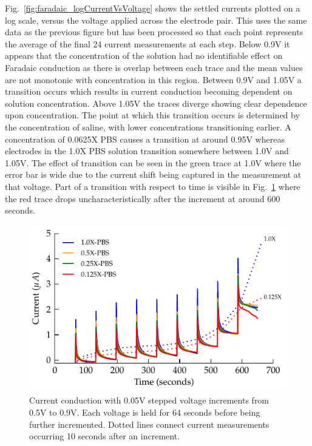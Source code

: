 \documentclass[journal, a4paper]{IEEEtran}
\begin{document}
Fig.~\ref{fig:faradaic_logCurrentVsVoltage} shows the settled currents plotted on a log scale, versus the voltage applied across the electrode pair. This uses the same data as the previous figure but has been processed so that each point represents the average of the final 24 current measurements at each step. Below 0.9\thinspace V it appears that the concentration of the solution had no identifiable effect on Faradaic conduction as there is overlap between each trace and the mean values are not monotonic with concentration in this region.  Between 0.9\thinspace V and 1.05\thinspace V a transition occurs which results in current conduction becoming dependent on solution concentration.
Above 1.05\thinspace V the traces diverge showing clear dependence upon concentration.
The point at which this transition occurs is determined by the concentration of saline, with lower concentrations transitioning earlier. A concentration of 0.0625X PBS causes a transition at around 0.95\thinspace V whereas electrodes in the 1.0X PBS solution transition somewhere between 1.0\thinspace V and 1.05\thinspace V. The effect of transition can be seen in the green trace at 1.0\thinspace V where the error bar is wide due to the current shift being captured in the measurement at that voltage. Part of a transition with respect to time is visible in Fig.~\ref{fig:StepResponse_Faradaic} where the red trace drops uncharacteristically after the increment at around 600 seconds.

\begin{figure}
    \begin{center}
        \includegraphics{graphics/currentTimeFaradaicCPE_Stacked_IEEE}
    \end{center}
    \caption{Current conduction with 0.05\thinspace V stepped voltage increments from 0.5\thinspace V to 0.9V. Each voltage is held for 64 seconds before being further incremented. Dotted lines connect current measurements occurring 10 seconds after an increment.}
    \label{fig:StepResponse_Faradaic}
\end{figure}
\end{document}
